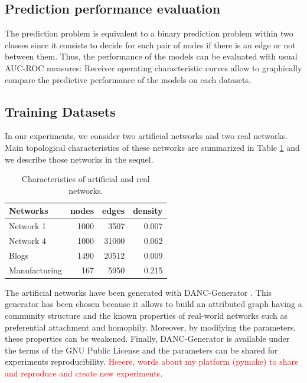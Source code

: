\subsection{Prediction performance evaluation}
The prediction problem is equivalent to a binary prediction problem within two classes since it consists to decide for each pair of nodes if there is an edge or not between them. 
Thus, the performance of the models can be evaluated with usual AUC-ROC measures: Receiver operating characteristic curves allow to graphically compare the predictive performance of the models on each datasets.

\subsection{Training Datasets}

In our experiments, we consider two artificial networks and two real networks.  Main topological characteristics of these networks are summarized in Table \ref{table:networks_measures} and we describe those networks in the sequel.

\begin{table}[h] 
	\centering
	\caption{Characteristics of artificial and real networks.}
    \begin{tabular}{lrrr}
        \hline
        \textbf{Networks} &   nodes &   edges &   density \\
        \hline
        Network 1 &    1000 &    3507 &     0.007 \\
        Network 4 &    1000 &   31000 &     0.062 \\
        Blogs         &    1490 &   20512 &     0.009 \\
        Manufacturing &     167 &    5950 &     0.215 \\
    \hline
    \end{tabular}
	\label{table:networks_measures}
\end{table}

The artificial networks have been generated with DANC-Generator \cite{largeron2015}. This generator has been chosen because it allows to build an attributed graph having a community structure  and  the known properties of real-world networks such as preferential attachment and homophily.
Moreover, by modifying the parameters, these properties can be weakened. Finally, DANC-Generator is available under the terms of the GNU Public License and the parameters can be shared for experiments reproducibility. \textcolor{red}{Heeere, words about my platform (pymake) to share and reproduce and create new experiments}.

